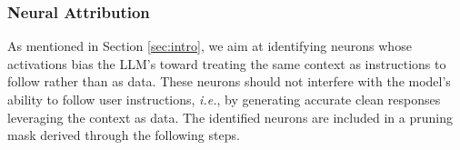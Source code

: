 \subsubsection{Neural Attribution} \label{sc: na}

As mentioned in Section \ref{sec:intro},
we aim at identifying neurons whose
activations bias the LLM’s toward
treating the same context as instructions
to follow rather than as data.
These neurons should not interfere with the model's ability to follow user instructions, \emph{i.e.}, by generating accurate clean responses leveraging the context as data.
The identified neurons are included in a pruning mask derived through the following steps.





\vspace{1mm}



